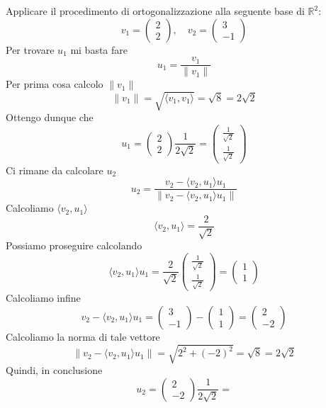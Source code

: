 \begin{example}
	Applicare il procedimento di ortogonalizzazione alla seguente base di $\mathbb{R}^2$:
	\[
		v_1 = \begin{pmatrix} 2 \\ 2 \end{pmatrix}, \quad
		v_2 = \begin{pmatrix} 3 \\ -1 \end{pmatrix}
	\]
	Per trovare $u_1$ mi basta fare
	\[
		u_1 = \frac{v_1}{\| v_1 \|}
	\]
	Per prima cosa calcolo $\| v_1 \|$
	\[ \| v_1 \| = \sqrt{\langle v_1, v_1 \rangle} = \sqrt{8} = 2 \sqrt{2} \]
	Ottengo dunque che
	\[
		u_1 = \begin{pmatrix}
			2 \\ 2
		\end{pmatrix} \frac{1}{2 \sqrt{2}} =
		\begin{pmatrix}
			\frac{1}{\sqrt{2}} \\ \frac{1}{\sqrt{2}}
		\end{pmatrix}
	\]
	Ci rimane da calcolare $u_2$
	\[
		u_2 = \frac{v_2 - \langle v_2, u_1 \rangle u_1}
		{\| v_2 - \langle v_2, u_1 \rangle u_1 \|}
	\]
	Calcoliamo $\langle v_2, u_1 \rangle$
	\[
		\langle v_2, u_1 \rangle = \frac{2}{\sqrt{2}}
	\]
	Possiamo proseguire calcolando
	\[
		\langle v_2, u_1 \rangle u_1 =
		\frac{2}{\sqrt{2}}
		\begin{pmatrix}
			\frac{1}{\sqrt{2}} \\ \frac{1}{\sqrt{2}}
		\end{pmatrix} =
		\begin{pmatrix}
			1 \\ 1
		\end{pmatrix}
	\]
	Calcoliamo infine
	\[
		v_2 - \langle v_2, u_1 \rangle u_1 =
		\begin{pmatrix} 3 \\ -1 \end{pmatrix} - \begin{pmatrix} 1 \\ 1 \end{pmatrix} =
		\begin{pmatrix} 2 \\ -2 \end{pmatrix}
	\]
	Calcoliamo la norma di tale vettore
	\[
		\| v_2 - \langle v_2, u_1 \rangle u_1 \| = \sqrt{ 2^2 + (-2)^2 } = \sqrt{8} = 2 \sqrt{2}
	\]
	Quindi, in conclusione
	\[
		u_2 = \begin{pmatrix} 2 \\ -2 \end{pmatrix} \frac{1}{2 \sqrt{2}} =
\]
\end{example}
